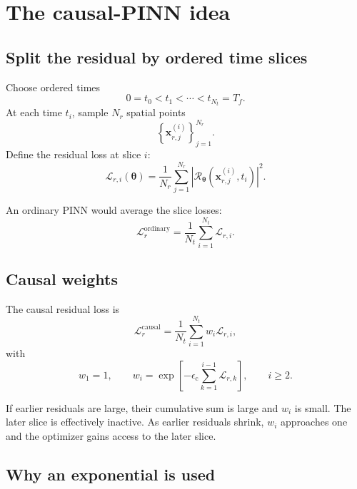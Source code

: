 \documentclass[11pt]{article}
\newcommand{\thetav}{\bm{\theta}}
\newcommand{\xv}{\bm{x}}
\newcommand{\Rnet}{\mathcal{R}_{\thetav}}
\newcommand{\epsc}{\epsilon_{\mathrm{c}}}
\begin{document}
\section{The causal-PINN idea}

\subsection{Split the residual by ordered time slices}

Choose ordered times
\begin{equation}
0=t_0<t_1<\cdots<t_{N_t}=T_f.
\end{equation}
At each time $t_i$, sample $N_r$ spatial points
\begin{equation}
\left\{
\xv_{r,j}^{(i)}
\right\}_{j=1}^{N_r}.
\end{equation}
Define the residual loss at slice $i$:
\begin{equation}
\mathcal{L}_{r,i}(\thetav)
=
\frac{1}{N_r}
\sum_{j=1}^{N_r}
\left|
\Rnet(\xv_{r,j}^{(i)},t_i)
\right|^2.
\label{eq:slice_residual}
\end{equation}

An ordinary PINN would average the slice losses:
\begin{equation}
\mathcal{L}_{r}^{\mathrm{ordinary}}
=
\frac{1}{N_t}
\sum_{i=1}^{N_t}
\mathcal{L}_{r,i}.
\end{equation}

\subsection{Causal weights}

The causal residual loss is
\begin{equation}
\mathcal{L}_{r}^{\mathrm{causal}}
=
\frac{1}{N_t}
\sum_{i=1}^{N_t}
w_i\mathcal{L}_{r,i},
\label{eq:causal_residual}
\end{equation}
with
\begin{equation}
w_1=1,
\qquad
w_i
=
\exp\left[
-\epsc
\sum_{k=1}^{i-1}
\mathcal{L}_{r,k}
\right],
\qquad i\ge 2.
\label{eq:causal_weight_basic}
\end{equation}

If earlier residuals are large, their cumulative sum is large and $w_i$ is small. The later slice is effectively inactive. As earlier residuals shrink, $w_i$ approaches one and the optimizer gains access to the later slice.

\subsection{Why an exponential is used}
\end{document}
